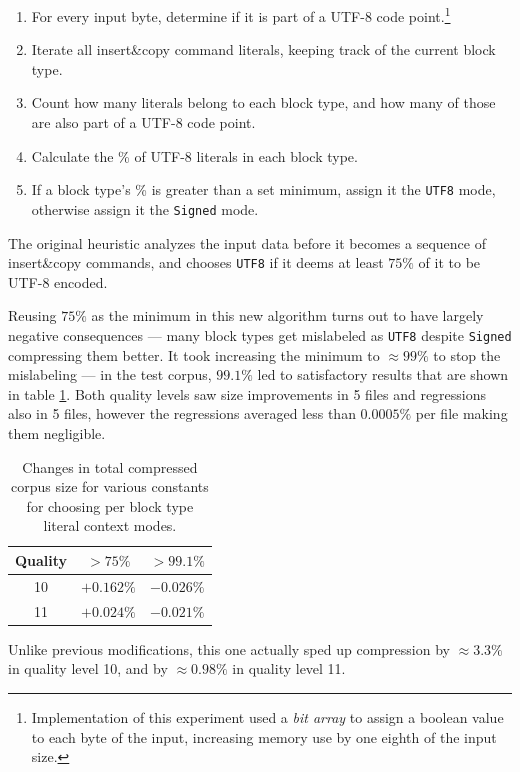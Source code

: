 \documentclass[english,master,dept460,male,cpp,cpdeclaration]{diploma}
\newcommand{\nosep}{\itemsep0em}
\begin{document}
		\begin{enumerate} \nosep
			\item For every input byte, determine if it is part of a UTF-8 code point.\footnote{Implementation of this experiment used a \emph{bit array} to assign a boolean value to each byte of the input, increasing memory use by one eighth of the input size.}
			\item Iterate all insert\&copy command literals, keeping track of the current block type.
			\item Count how many literals belong to each block type, and how many of those are also part of a UTF-8 code point.
			\item Calculate the \% of UTF-8 literals in each block type.
			\item If a block type's \% is greater than a set minimum, assign it the \verb|UTF8| mode, otherwise assign it the \verb|Signed| mode.
		\end{enumerate}
		
		\noindent
		The original heuristic analyzes the input data before it becomes a sequence of insert\&copy commands, and chooses \verb|UTF8| if it deems at least $75 \%$ of it to be UTF-8 encoded.
		
		Reusing $75 \%$ as the minimum in this new algorithm turns out to have largely negative consequences --- many block types get mislabeled as \verb|UTF8| despite \verb|Signed| compressing them better. It took increasing the minimum to $\approx 99 \%$ to stop the mislabeling --- in the test corpus, $99.1 \%$ led to satisfactory results that are shown in table \ref{table:multi-lcm-results}. Both quality levels saw size improvements in 5 files and regressions also in 5 files, however the regressions averaged less than $0.0005 \%$ per file making them negligible.
		
		\begin{table}[H]
			\centering
			\caption{Changes in total compressed corpus size for various constants for choosing per block type literal context modes.}
			\label{table:multi-lcm-results}
			\begin{tabular}{c|c|c}
				Quality &  $> 75 \%$  & $> 99.1 \%$ \\ \hline
				  10    & $+0.162 \%$ & $-0.026 \%$ \\
				  11    & $+0.024 \%$ & $-0.021 \%$
			\end{tabular}
		\end{table}
		
		\noindent
		Unlike previous modifications, this one actually sped up compression by $\approx 3.3 \%$ in quality level 10, and by $\approx 0.98 \%$ in quality level 11.
		
\end{document}
